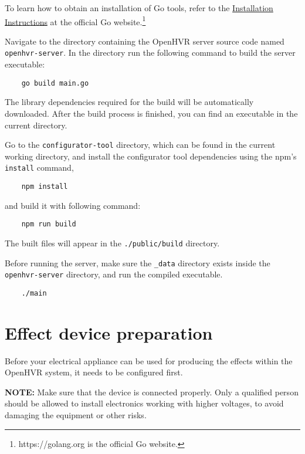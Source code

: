 To learn how to obtain an installation of Go tools, refer to the
\hyperlink{https://golang.org/doc/install}{Installation Instructions} at the
official Go website.\footnote{https://golang.org is the official Go website.}

Navigate to the directory containing the OpenHVR server source code named
\verb|openhvr-server|. In the directory run the following command to build the
server executable:

\begin{verbatim}
    go build main.go
\end{verbatim}

The library dependencies required for the build will be automatically downloaded.
After the build process is finished, you can find an executable in the current
directory.

Go to the \verb|configurator-tool| directory, which can be found in the current
working directory, and install the configurator tool dependencies using the npm's
\verb|install| command,

\begin{verbatim}
    npm install
\end{verbatim}

and build it with following command:

\begin{verbatim}
    npm run build
\end{verbatim}

The built files will appear in the \verb|./public/build| directory.

Before running the server, make sure the \verb|_data| directory exists inside
the \verb|openhvr-server| directory, and run the compiled executable.

\begin{verbatim}
    ./main
\end{verbatim}

\section*{Effect device preparation}

Before your electrical appliance can be used for producing the effects
within the OpenHVR system, it needs to be configured first.

\textbf{NOTE:} Make sure that the device is connected properly. Only a qualified
person should be allowed to install electronics working with higher voltages, to avoid
damaging the equipment or other risks.

